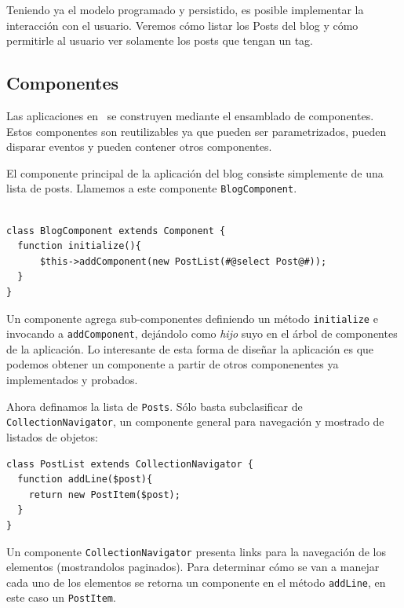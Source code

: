 Teniendo ya el modelo programado y persistido, es posible implementar la interacción con el usuario. Veremos cómo listar los Posts del blog y cómo permitirle al usuario ver solamente los posts que tengan un tag.

\subsection{Componentes}
\label{sub-comp}

Las aplicaciones en \PWB\ se construyen mediante el ensamblado de componentes. Estos componentes son reutilizables ya que pueden ser parametrizados, pueden disparar eventos y pueden contener otros componentes.

El componente principal de la aplicación del blog consiste simplemente de una lista de posts. Llamemos a este componente \verb"BlogComponent".

\begin{verbatim}

class BlogComponent extends Component {
  function initialize(){
      $this->addComponent(new PostList(#@select Post@#));
  }
}
\end{verbatim}

Un componente agrega sub-componentes definiendo un método \verb"initialize" e invocando a \verb"addComponent", dejándolo como \emph{hijo} suyo en el árbol de componentes de la aplicación. Lo interesante de esta forma de diseñar la aplicación es que podemos obtener un componente a partir de otros componenentes ya implementados y probados.


Ahora definamos la lista de \verb"Posts". Sólo basta subclasificar de \verb"CollectionNavigator", un componente general para navegación y mostrado de listados de objetos:

\begin{verbatim}
class PostList extends CollectionNavigator {
  function addLine($post){
    return new PostItem($post);
  }
}

\end{verbatim}

Un componente \verb"CollectionNavigator" presenta links para la navegación de los elementos (mostrandolos paginados). Para determinar cómo se van a manejar cada uno de los elementos se retorna un componente en el método \verb"addLine", en este caso un \verb'PostItem'.

